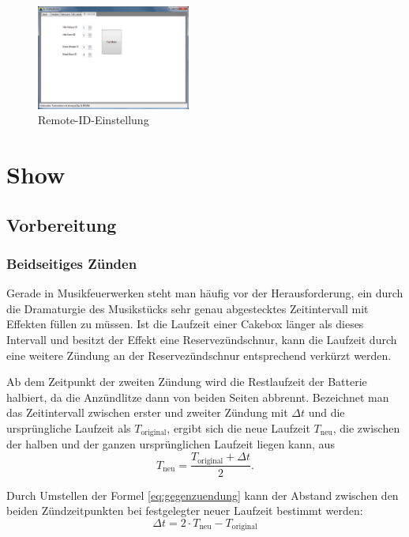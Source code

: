 \documentclass[paper=a4, parskip, numbers=noenddot, toc=listof, headsepline]{scrbook}
\begin{document}
			\begin{figure}[!t]
				\centering
				\includegraphics[width=0.45\textwidth]{bilder/gui-remote}
				\caption{Remote-ID-Einstellung}
				\label{fig:gui-remote}
			\end{figure}

	\chapter{Show}

		\section{Vorbereitung}

			\subsection{Beidseitiges Zünden}
				Gerade in Musikfeuerwerken steht man häufig vor der Herausforderung, ein durch die Dramaturgie des Musikstücks sehr genau abgestecktes Zeitintervall mit Effekten füllen zu müssen. Ist die Laufzeit einer Cakebox länger als dieses Intervall und besitzt der Effekt eine Reservezündschnur, kann die Laufzeit durch eine weitere Zündung an der Reservezündschnur entsprechend verkürzt werden.

				Ab dem Zeitpunkt der zweiten Zündung wird die Restlaufzeit der Batterie halbiert, da die Anzündlitze dann von beiden Seiten abbrennt. Bezeichnet man das Zeitintervall zwischen erster und zweiter Zündung mit ${\Delta}t$ und die ursprüngliche Laufzeit als $T_\text{original}$, ergibt sich die neue Laufzeit $T_\text{neu}$, die zwischen der halben und der ganzen ursprünglichen Laufzeit liegen kann, aus
				\begin{equation}
					T_\text{neu} = \frac{T_\text{original} + {\Delta}t}{2}.
					\label{eq:gegenzuendung}
				\end{equation}

				Durch Umstellen der Formel \eqref{eq:gegenzuendung} kann der Abstand zwischen den beiden Zündzeitpunkten bei festgelegter neuer Laufzeit bestimmt werden:
				\begin{equation}
					{\Delta}t = 2 {\cdot} T_\text{neu} - T_\text{original}
				\end{equation}
\end{document}
